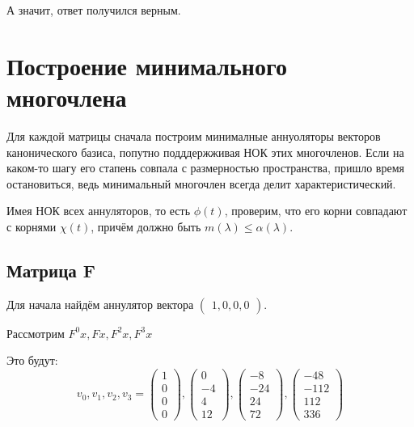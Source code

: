 \documentclass[12pt, a4paper]{article}
\begin{document}
    А значит, ответ получился верным.

    \section{Построение минимального многочлена}

    Для каждой матрицы сначала построим минималные аннуоляторы
    векторов канонического базиса, попутно подддержживая НОК этих многочленов. 
    Если на каком-то шагу его стапень совпала с размерностью пространства, пришло время остановиться, 
    ведь минимальный многочлен всегда делит характеристический.

    Имея НОК всех аннуляторов, то есть $\phi(t)$, проверим, что его корни совпадают с корнями $\chi(t)$,
    причём должно быть $m(\lambda) \leqslant \alpha(\lambda)$.

    \subsection{Матрица F}

    Для начала найдём аннулятор вектора $\begin{pmatrix}
        1, 0, 0, 0
    \end{pmatrix}$.

    Рассмотрим $F^0x, Fx, F^2x, F^3x$

    Это будут: 
    \begin{equation}
        v_0, v_1, v_2, v_3 = \left(\begin{matrix}
            1\\0\\0\\0
        \end{matrix}\right), \left(\begin{matrix}
            0\\-4\\4 \\12
        \end{matrix}\right), \left(\begin{matrix}
            -8\\-24\\24\\72
        \end{matrix}\right), \left(\begin{matrix}
            -48\\-112\\112\\336
        \end{matrix}\right)
    \end{equation}
\end{document}
